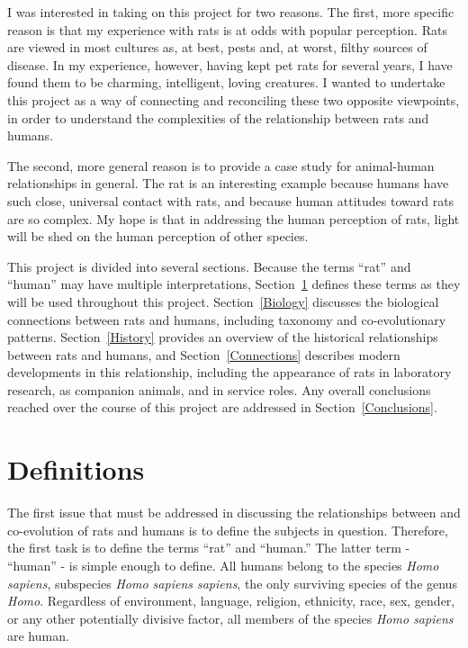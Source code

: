 \documentclass[12pt]{article}
\begin{document}
I was interested in taking on this project for two reasons. The first, more specific reason is that my experience with rats is at odds with popular perception. Rats are viewed in most cultures as, at best, pests and, at worst, filthy sources of disease. In my experience, however, having kept pet rats for several years, I have found them to be charming, intelligent, loving creatures. I wanted to undertake this project as a way of connecting and reconciling these two opposite viewpoints, in order to understand the complexities of the relationship between rats and humans.

The second, more general reason is to provide a case study for animal-human relationships in general. The rat is an interesting example because humans have such close, universal contact with rats, and because human attitudes toward rats are so complex. My hope is that in addressing the human perception of rats, light will be shed on the human perception of other species.

This project is divided into several sections. Because the terms ``rat'' and ``human'' may have multiple interpretations, Section~\ref{Definitions} defines these terms as they will be used throughout this project. Section~\ref{Biology} discusses the biological connections between rats and humans, including taxonomy and co-evolutionary patterns. Section~\ref{History} provides an overview of the historical relationships between rats and humans, and Section~\ref{Connections} describes modern developments in this relationship, including the appearance of rats in laboratory research, as companion animals, and in service roles. Any overall conclusions reached over the course of this project are addressed in Section~\ref{Conclusions}.

\section{Definitions} \label{Definitions}

The first issue that must be addressed in discussing the relationships between and co-evolution of rats and humans is to define the subjects in question. Therefore, the first task is to define the terms ``rat'' and ``human.'' The latter term - ``human'' - is simple enough to define. All humans belong to the species \textit{Homo sapiens}, subspecies \textit{Homo sapiens sapiens}, the only surviving species of the genus \textit{Homo}. Regardless of environment, language, religion, ethnicity, race, sex, gender, or any other potentially divisive factor, all members of the species \textit{Homo sapiens} are human.
\end{document}
